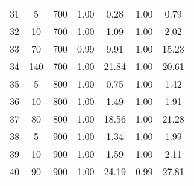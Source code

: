 \documentclass[11pt]{article}
\begin{document}
\begin{table}[]
\begin{tabular}{ccccccc}
			\rowcolor[HTML]{EFEFEF} 
			31 & 5 & 700 & 1.00 & 0.28 & 1.00 & 0.79 \\
			\rowcolor[HTML]{EFEFEF} 
			32 & 10 & 700 & 1.00 & 1.09 & 1.00 & 2.02 \\
			\rowcolor[HTML]{EFEFEF} 
			33 & 70 & 700 & 0.99 & 9.91 & 1.00 & 15.23 \\
			\rowcolor[HTML]{EFEFEF} 
			34 & 140 & 700 & 1.00 & 21.84 & 1.00 & 20.61 \\
			35 & 5 & 800 & 1.00 & 0.75 & 1.00 & 1.42 \\
			36 & 10 & 800 & 1.00 & 1.49 & 1.00 & 1.91 \\
			37 & 80 & 800 & 1.00 & 18.56 & 1.00 & 21.28 \\
			\rowcolor[HTML]{EFEFEF} 
			38 & 5 & 900 & 1.00 & 1.34 & 1.00 & 1.99 \\
			\rowcolor[HTML]{EFEFEF} 
			39 & 10 & 900 & 1.00 & 1.59 & 1.00 & 2.11 \\
			\rowcolor[HTML]{EFEFEF} 
			40 & 90 & 900 & 1.00 & 24.19 & 0.99 & 27.81
		\end{tabular}
	\end{table}
	
\end{document}
